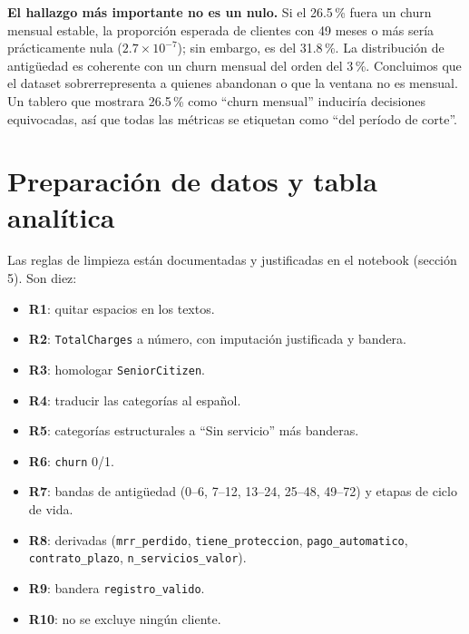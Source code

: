 \documentclass[10.5pt,a4paper]{article}
\begin{document}
\textbf{El hallazgo más importante no es un nulo.} Si el 26.5\,\% fuera un churn mensual estable, la proporción esperada de clientes con 49 meses o más sería prácticamente nula ($2.7\times10^{-7}$); sin embargo, es del 31.8\,\%. La distribución de antigüedad es coherente con un churn mensual del orden del 3\,\%. Concluimos que el dataset sobrerrepresenta a quienes abandonan o que la ventana no es mensual. Un tablero que mostrara 26.5\,\% como ``churn mensual'' induciría decisiones equivocadas, así que todas las métricas se etiquetan como ``del período de corte''.

\section{Preparación de datos y tabla analítica}
Las reglas de limpieza están documentadas y justificadas en el notebook (sección 5). Son diez:
\begin{itemize}
  \item \textbf{R1}: quitar espacios en los textos.
  \item \textbf{R2}: \texttt{TotalCharges} a número, con imputación justificada y bandera.
  \item \textbf{R3}: homologar \texttt{SeniorCitizen}.
  \item \textbf{R4}: traducir las categorías al español.
  \item \textbf{R5}: categorías estructurales a ``Sin servicio'' más banderas.
  \item \textbf{R6}: \texttt{churn} 0/1.
  \item \textbf{R7}: bandas de antigüedad (0–6, 7–12, 13–24, 25–48, 49–72) y etapas de ciclo de vida.
  \item \textbf{R8}: derivadas (\texttt{mrr\_perdido}, \texttt{tiene\_proteccion}, \texttt{pago\_automatico}, \texttt{contrato\_plazo}, \texttt{n\_servicios\_valor}).
  \item \textbf{R9}: bandera \texttt{registro\_valido}.
  \item \textbf{R10}: no se excluye ningún cliente.
\end{itemize}
\end{document}
